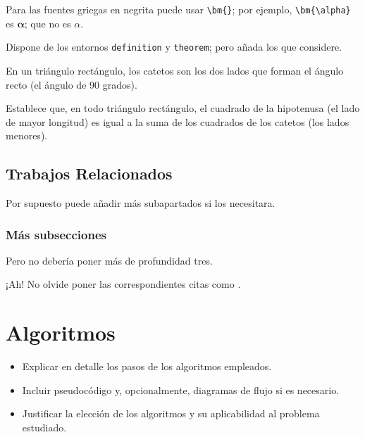 Para las fuentes griegas en negrita puede usar \verb+\bm{}+; por ejemplo, \verb+\bm{\alpha}+ es $\bm{\alpha}$; que no es  $\alpha$.


Dispone de los  entornos \texttt{definition} y \texttt{theorem}; pero añada los que considere.


\begin{definition}[Cateto]
En un triángulo rectángulo, los catetos son los dos lados que forman el ángulo recto (el ángulo de 90 grados).
\end{definition}


\begin{theorem}[T. de Pitágoras]
Establece que, en todo triángulo rectángulo, el cuadrado de la hipotenusa (el lado de mayor longitud) es igual a la suma de los cuadrados de los catetos (los lados menores).
\end{theorem}


\subsection{Trabajos Relacionados}

Por supuesto puede añadir más subapartados si los necesitara.

\subsubsection{Más subsecciones}

Pero no debería poner más de profundidad tres.

¡Ah! No olvide poner las correspondientes citas como \cite{ref1, ref2}.



\section{Algoritmos}
    \begin{itemize}
        \item Explicar en detalle los pasos de los algoritmos empleados.
        \item Incluir pseudocódigo y, opcionalmente, diagramas de flujo si es necesario.
        \item Justificar la elección de los algoritmos y su aplicabilidad al problema estudiado.
    \end{itemize}


